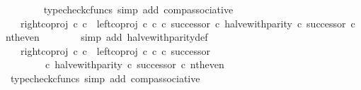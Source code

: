 \begin{isabellebody}
\ \ \ \ \ \ \isamarkupfalse%
\ {\isacharparenleft}{\kern0pt}typecheck{\isacharunderscore}{\kern0pt}cfuncs{\isacharcomma}{\kern0pt}\ simp\ add{\isacharcolon}{\kern0pt}\ comp{\isacharunderscore}{\kern0pt}associative{}{\isacharparenright}{\kern0pt}\isanewline
\ \ \ \ \isamarkupfalse%
\ \isamarkupfalse%
\ {\isachardoublequoteopen}{\isachardot}{\kern0pt}{\isachardot}{\kern0pt}{\isachardot}{\kern0pt}\ {\isacharequal}{\kern0pt}\ {\isacharparenleft}{\kern0pt}{\isacharparenleft}{\kern0pt}{\isacharparenleft}{\kern0pt}right{\isacharunderscore}{\kern0pt}coproj\ {\isasymnat}\isactrlsub c\ {\isasymnat}\isactrlsub c\ {\isasymamalg}\ {\isacharparenleft}{\kern0pt}left{\isacharunderscore}{\kern0pt}coproj\ {\isasymnat}\isactrlsub c\ {\isasymnat}\isactrlsub c\ {\isasymcirc}\isactrlsub c\ successor{\isacharparenright}{\kern0pt}{\isacharparenright}{\kern0pt}\ {\isasymcirc}\isactrlsub c\ halve{\isacharunderscore}{\kern0pt}with{\isacharunderscore}{\kern0pt}parity{\isacharparenright}{\kern0pt}\ {\isasymcirc}\isactrlsub c\ successor{\isacharparenright}{\kern0pt}\ {\isasymcirc}\isactrlsub c\ nth{\isacharunderscore}{\kern0pt}even{\isachardoublequoteclose}\isanewline
\ \ \ \ \ \ \isamarkupfalse%
\ {\isacharparenleft}{\kern0pt}simp\ add{\isacharcolon}{\kern0pt}\ halve{\isacharunderscore}{\kern0pt}with{\isacharunderscore}{\kern0pt}parity{\isacharunderscore}{\kern0pt}def{}{\isacharparenright}{\kern0pt}\isanewline
\ \ \ \ \isamarkupfalse%
\ \isamarkupfalse%
\ {\isachardoublequoteopen}{\isachardot}{\kern0pt}{\isachardot}{\kern0pt}{\isachardot}{\kern0pt}\ {\isacharequal}{\kern0pt}\ {\isacharparenleft}{\kern0pt}right{\isacharunderscore}{\kern0pt}coproj\ {\isasymnat}\isactrlsub c\ {\isasymnat}\isactrlsub c\ {\isasymamalg}\ {\isacharparenleft}{\kern0pt}left{\isacharunderscore}{\kern0pt}coproj\ {\isasymnat}\isactrlsub c\ {\isasymnat}\isactrlsub c\ {\isasymcirc}\isactrlsub c\ successor{\isacharparenright}{\kern0pt}{\isacharparenright}{\kern0pt}\isanewline
\ \ \ \ \ \ \ \ {\isasymcirc}\isactrlsub c\ {\isacharparenleft}{\kern0pt}halve{\isacharunderscore}{\kern0pt}with{\isacharunderscore}{\kern0pt}parity\ {\isasymcirc}\isactrlsub c\ successor{\isacharparenright}{\kern0pt}\ {\isasymcirc}\isactrlsub c\ nth{\isacharunderscore}{\kern0pt}even{\isachardoublequoteclose}\isanewline
\ \ \ \ \ \ \isamarkupfalse%
\ {\isacharparenleft}{\kern0pt}typecheck{\isacharunderscore}{\kern0pt}cfuncs{\isacharcomma}{\kern0pt}\ simp\ add{\isacharcolon}{\kern0pt}\ comp{\isacharunderscore}{\kern0pt}associative{}{\isacharparenright}{\kern0pt}\isanewline

\end{isabellebody}
